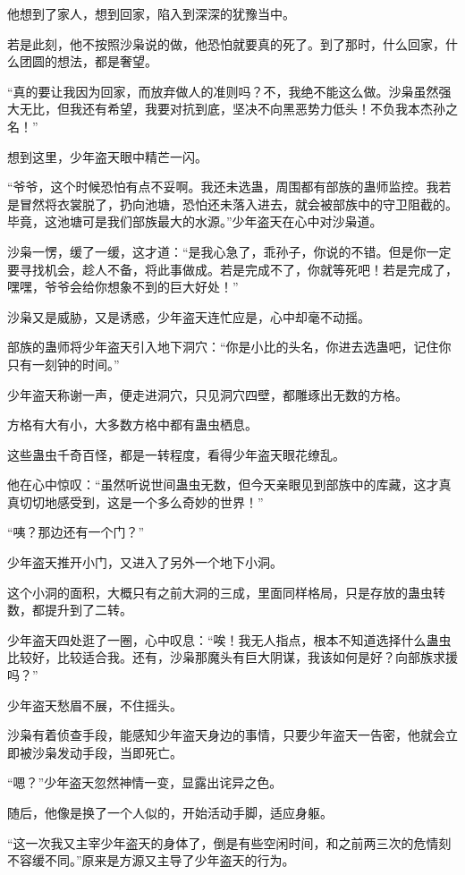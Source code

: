 \begin{this_body}
他想到了家人，想到回家，陷入到深深的犹豫当中。

若是此刻，他不按照沙枭说的做，他恐怕就要真的死了。到了那时，什么回家，什么团圆的想法，都是奢望。

“真的要让我因为回家，而放弃做人的准则吗？不，我绝不能这么做。沙枭虽然强大无比，但我还有希望，我要对抗到底，坚决不向黑恶势力低头！不负我本杰孙之名！”

想到这里，少年盗天眼中精芒一闪。

“爷爷，这个时候恐怕有点不妥啊。我还未选蛊，周围都有部族的蛊师监控。我若是冒然将衣裳脱了，扔向池塘，恐怕还未落入进去，就会被部族中的守卫阻截的。毕竟，这池塘可是我们部族最大的水源。”少年盗天在心中对沙枭道。

沙枭一愣，缓了一缓，这才道：“是我心急了，乖孙子，你说的不错。但是你一定要寻找机会，趁人不备，将此事做成。若是完成不了，你就等死吧！若是完成了，嘿嘿，爷爷会给你想象不到的巨大好处！”

沙枭又是威胁，又是诱惑，少年盗天连忙应是，心中却毫不动摇。

部族的蛊师将少年盗天引入地下洞穴：“你是小比的头名，你进去选蛊吧，记住你只有一刻钟的时间。”

少年盗天称谢一声，便走进洞穴，只见洞穴四壁，都雕琢出无数的方格。

方格有大有小，大多数方格中都有蛊虫栖息。

这些蛊虫千奇百怪，都是一转程度，看得少年盗天眼花缭乱。

他在心中惊叹：“虽然听说世间蛊虫无数，但今天亲眼见到部族中的库藏，这才真真切切地感受到，这是一个多么奇妙的世界！”

“咦？那边还有一个门？”

少年盗天推开小门，又进入了另外一个地下小洞。

这个小洞的面积，大概只有之前大洞的三成，里面同样格局，只是存放的蛊虫转数，都提升到了二转。

少年盗天四处逛了一圈，心中叹息：“唉！我无人指点，根本不知道选择什么蛊虫比较好，比较适合我。还有，沙枭那魔头有巨大阴谋，我该如何是好？向部族求援吗？”

少年盗天愁眉不展，不住摇头。

沙枭有着侦查手段，能感知少年盗天身边的事情，只要少年盗天一告密，他就会立即被沙枭发动手段，当即死亡。

“嗯？”少年盗天忽然神情一变，显露出诧异之色。

随后，他像是换了一个人似的，开始活动手脚，适应身躯。

“这一次我又主宰少年盗天的身体了，倒是有些空闲时间，和之前两三次的危情刻不容缓不同。”原来是方源又主导了少年盗天的行为。


\end{this_body}
